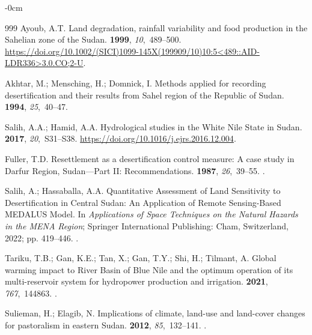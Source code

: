 \documentclass[jimaging,article,accept,pdftex,moreauthors]{Definitions/mdpi}
\begin{document}
\begin{adjustwidth}{-\extralength}{0cm}
\begin{thebibliography}{999}
Ayoub, A.T.
\newblock Land degradation, rainfall variability and food production in the
  Sahelian zone of the Sudan.
 {\bf 1999}, {\em 10},~489--500.
\newblock
  {\url{https://doi.org/10.1002/(SICI)1099-145X(199909/10)10:5<489::AID-LDR336>3.0.CO;2-U}}.

Akhtar, M.; Mensching, H.; Domnick, I.
\newblock Methods applied for recording desertification and their results from
  Sahel region of the Republic of Sudan.
 {\bf 1994}, {\em 25},~40--47.

Salih, A.A.; Hamid, A.A.
\newblock Hydrological studies in the White Nile State in Sudan.
 {\bf
  2017}, {\em 20},~S31--S38.
  {\url{https://doi.org/10.1016/j.ejrs.2016.12.004}}.

Fuller, T.D.
\newblock Resettlement as a desertification control measure: A case study in
  Darfur Region, Sudan---Part II: Recommendations.
 {\bf 1987}, {\em
  26},~39--55.
.

Salih, A.; Hassaballa, A.A. Quantitative Assessment of Land Sensitivity to
  Desertification in Central Sudan: An Application of Remote Sensing-Based
  MEDALUS Model.
\newblock In {\em Applications of Space Techniques on the Natural Hazards in
  the MENA Region}; Springer International Publishing: Cham, Switzerland,
  2022; pp. 419--446.
.

Tariku, T.B.; Gan, K.E.; Tan, X.; Gan, T.Y.; Shi, H.; Tilmant, A.
\newblock Global warming impact to River Basin of Blue Nile and the optimum
  operation of its multi-reservoir system for hydropower production and
  irrigation.
 {\bf 2021}, {\em 767},~144863.
.

\clearpage
{}
Sulieman, H.; Elagib, N.
\newblock Implications of climate, land-use and land-cover changes for
  pastoralism in eastern Sudan.
 {\bf 2012}, {\em 85},~132--141.
.


\end{thebibliography}
\end{adjustwidth}
\end{document}
